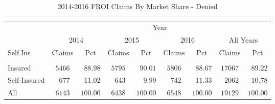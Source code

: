 \documentclass[9pt, oneside]{article}   	%
\begin{document}
\begin{longtable}{lcccccccc}
\caption{2014-2016 FROI Claims By Market Share - Denied}\\ 
\label{Table: Four.Denied}\\
\hline
                  \toprule
 & \multicolumn{8}{c}{Year} \\ 
 & \multicolumn{2}{c}{2014} & \multicolumn{2}{c}{2015} & \multicolumn{2}{c}{2016} & \multicolumn{2}{c}{All Years} \\ 
Self.Ins  & Claims & Pct & Claims & Pct & Claims & Pct & Claims & \multicolumn{1}{c}{Pct} \\ 
\midrule\\ [-1\normalbaselineskip]\hline\endhead\hline\endfoot
Insured  & $5466$ & $\phantom{0}88.98$ & $5795$ & $\phantom{0}90.01$ & $5806$ & $\phantom{0}88.67$ & $17067$ & $\phantom{0}89.22$ \\
Self-Insured  & $\phantom{0}677$ & $\phantom{0}11.02$ & $\phantom{0}643$ & $\phantom{00}9.99$ & $\phantom{0}742$ & $\phantom{0}11.33$ & $\phantom{0}2062$ & $\phantom{0}10.78$ \\
\cline{1-1} \cline{2-2} \cline{3-3} \cline{4-4} \cline{5-5} \cline{6-6} \cline{7-7} \cline{8-8} \cline{9-9} \cline{10-10}   %
All  & $6143$ & $100.00$ & $6438$ & $100.00$ & $6548$ & $100.00$ & $19129$ & $100.00$ \\
\hline 
\end{longtable}
\end{document}
